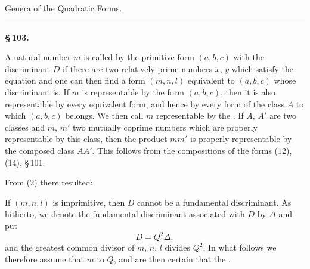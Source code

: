 \begin{center}

Genera of the Quadratic Forms.
\end{center}
\begin{center}\rule{0.2\linewidth}{0.4pt}\end{center}

\begin{center}
\textbf{\S\,103. }
\end{center}

A natural number $m$ is called  by the primitive form $(a,b,c)$ with the discriminant $D$ if there are two relatively prime numbers $x$, $y$ which satisfy the equation
and one can then find a form $(m,n,l)$ equivalent to $(a,b,c)$ whose discriminant
is. If $m$ is representable by the form $(a,b,c)$, then it is also representable by every equivalent form, and hence by every form of the class $A$ to which $(a,b,c)$ belongs. We then call $m$ representable by the . If $A$, $A'$ are two classes and $m$, $m'$ two mutually coprime numbers which are properly representable by this class, then the product $mm'$ is properly representable by the composed class $AA'$. This follows from the compositions of the forms (12), (14), \S\,101.

From (2) there resulted:

If $(m,n,l)$ is imprimitive, then $D$ cannot be a fundamental discriminant. As hitherto, we denote the fundamental discriminant associated with $D$ by $\Delta$ and put
\[
D = Q^2 \Delta,
\]
and the greatest common divisor of $m$, $n$, $l$ divides $Q^2$. In what follows we therefore assume that $m$  to $Q$, and are then certain that the .
